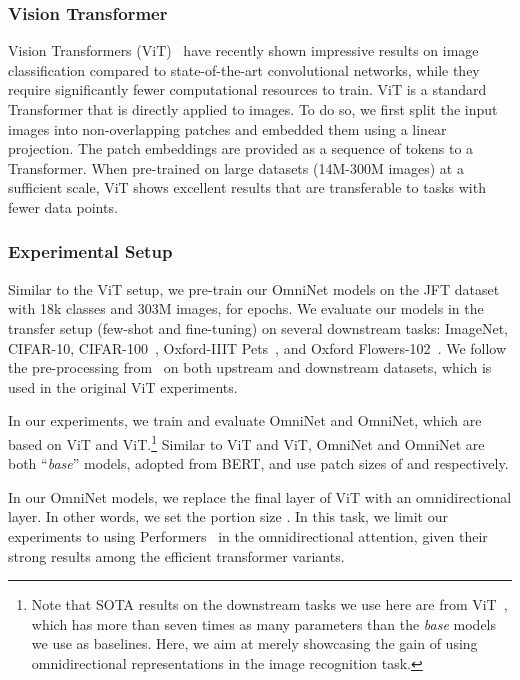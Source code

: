 \documentclass{article}
\begin{document}
\subsubsection{Vision Transformer}
Vision Transformers (ViT)~\citep{dosovitskiy2020image} have recently shown impressive results on image classification compared to state-of-the-art convolutional networks, while they require significantly fewer computational resources to train. ViT is a standard Transformer that is directly applied to images. To do so, we first split the input images into non-overlapping patches and embedded them using a linear projection. The patch embeddings are provided as a sequence of tokens to a Transformer. 
When pre-trained on large datasets (14M-300M images) at a sufficient scale, ViT shows excellent results that are transferable to tasks with fewer data points.


\subsubsection{Experimental Setup}
Similar to the ViT setup, we pre-train our OmniNet models on the JFT dataset~\citep{sun2017revisiting} with 18k classes and 303M images, for  epochs. We evaluate our models in the transfer setup (few-shot and fine-tuning) on several downstream tasks: ImageNet, CIFAR-10, CIFAR-100~\citep{krizhevsky2009learning}, Oxford-IIIT Pets~\citep{parkhi2012cats}, and Oxford Flowers-102~\citep{nilsback2008automated}. We follow the pre-processing from~\citep{kolesnikov2019big} on both upstream and downstream datasets, which is used in the original ViT experiments.

In our experiments, we train and evaluate OmniNet and OmniNet, which are based on ViT and ViT.\footnote{Note that SOTA results on the downstream tasks we use here are from ViT~\citep{dosovitskiy2020image}, which has more than seven times as many parameters than the \textit{base} models we use as baselines. Here, we aim at merely showcasing the gain of using omnidirectional representations in the image recognition task.} 
Similar to ViT and ViT, OmniNet and OmniNet are both ``\textit{base}'' models, adopted from BERT, and use patch sizes of  and  respectively. 

In our OmniNet models, we replace the final layer of ViT with an omnidirectional layer. In other words, we set the portion size . In this task, we limit our experiments to using Performers~\citep{choromanski2020rethinking} in the omnidirectional attention, given their strong results among the efficient transformer variants.
\end{document}
